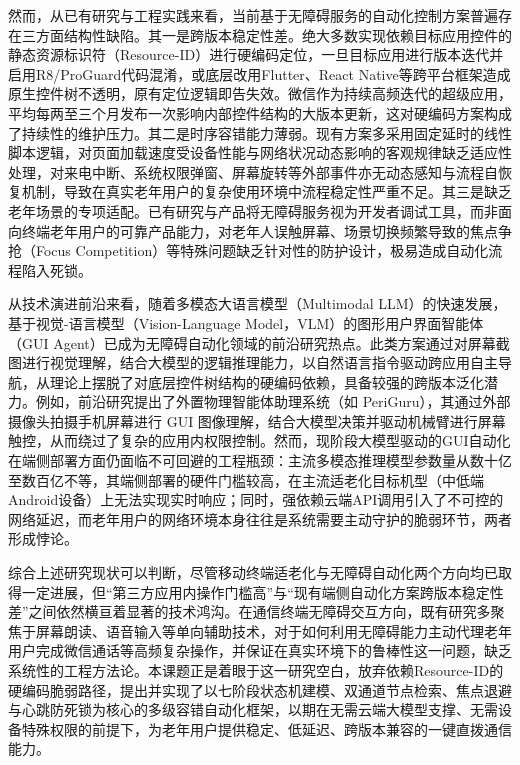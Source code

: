 然而，从已有研究与工程实践来看，当前基于无障碍服务的自动化控制方案普遍存在三方面结构性缺陷。其一是跨版本稳定性差。绝大多数实现依赖目标应用控件的静态资源标识符（Resource-ID）进行硬编码定位，一旦目标应用进行版本迭代并启用R8/ProGuard代码混淆，或底层改用Flutter、React Native等跨平台框架造成原生控件树不透明，原有定位逻辑即告失效。微信作为持续高频迭代的超级应用，平均每两至三个月发布一次影响内部控件结构的大版本更新，这对硬编码方案构成了持续性的维护压力。其二是时序容错能力薄弱。现有方案多采用固定延时的线性脚本逻辑，对页面加载速度受设备性能与网络状况动态影响的客观规律缺乏适应性处理，对来电中断、系统权限弹窗、屏幕旋转等外部事件亦无动态感知与流程自恢复机制，导致在真实老年用户的复杂使用环境中流程稳定性严重不足。其三是缺乏老年场景的专项适配。已有研究与产品将无障碍服务视为开发者调试工具，而非面向终端老年用户的可靠产品能力，对老年人误触屏幕、场景切换频繁导致的焦点争抢（Focus Competition）等特殊问题缺乏针对性的防护设计，极易造成自动化流程陷入死锁。

从技术演进前沿来看，随着多模态大语言模型（Multimodal LLM）的快速发展，基于视觉-语言模型（Vision-Language Model，VLM）的图形用户界面智能体（GUI Agent）已成为无障碍自动化领域的前沿研究热点。此类方案通过对屏幕截图进行视觉理解，结合大模型的逻辑推理能力，以自然语言指令驱动跨应用自主导航，从理论上摆脱了对底层控件树结构的硬编码依赖，具备较强的跨版本泛化潜力。例如，前沿研究提出了外置物理智能体助理系统（如 PeriGuru），其通过外部摄像头拍摄手机屏幕进行 GUI 图像理解，结合大模型决策并驱动机械臂进行屏幕触控，从而绕过了复杂的应用内权限控制。然而，现阶段大模型驱动的GUI自动化在端侧部署方面仍面临不可回避的工程瓶颈：主流多模态推理模型参数量从数十亿至数百亿不等，其端侧部署的硬件门槛较高，在主流适老化目标机型（中低端Android设备）上无法实现实时响应；同时，强依赖云端API调用引入了不可控的网络延迟，而老年用户的网络环境本身往往是系统需要主动守护的脆弱环节，两者形成悖论。

综合上述研究现状可以判断，尽管移动终端适老化与无障碍自动化两个方向均已取得一定进展，但“第三方应用内操作门槛高”与“现有端侧自动化方案跨版本稳定性差”之间依然横亘着显著的技术鸿沟。在通信终端无障碍交互方向，既有研究多聚焦于屏幕朗读、语音输入等单向辅助技术，对于如何利用无障碍能力主动代理老年用户完成微信通话等高频复杂操作，并保证在真实环境下的鲁棒性这一问题，缺乏系统性的工程方法论。本课题正是着眼于这一研究空白，放弃依赖Resource-ID的硬编码脆弱路径，提出并实现了以七阶段状态机建模、双通道节点检索、焦点退避与心跳防死锁为核心的多级容错自动化框架，以期在无需云端大模型支撑、无需设备特殊权限的前提下，为老年用户提供稳定、低延迟、跨版本兼容的一键直拨通信能力。



